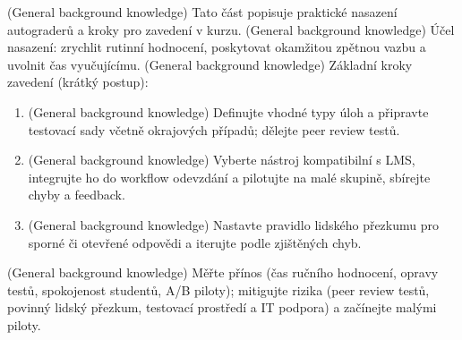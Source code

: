 (General background knowledge) Tato část popisuje praktické nasazení autograderů a kroky pro zavedení v kurzu.
(General background knowledge) Účel nasazení: zrychlit rutinní hodnocení, poskytovat okamžitou zpětnou vazbu a uvolnit čas vyučujícímu.
(General background knowledge) Základní kroky zavedení (krátký postup):
\begin{enumerate}
\item (General background knowledge) Definujte vhodné typy úloh a připravte testovací sady včetně okrajových případů; dělejte peer review testů.
\item (General background knowledge) Vyberte nástroj kompatibilní s LMS, integrujte ho do workflow odevzdání a pilotujte na malé skupině, sbírejte chyby a feedback.
\item (General background knowledge) Nastavte pravidlo lidského přezkumu pro sporné či otevřené odpovědi a iterujte podle zjištěných chyb.
\end{enumerate}
(General background knowledge) Měřte přínos (čas ručního hodnocení, opravy testů, spokojenost studentů, A/B piloty); mitigujte rizika (peer review testů, povinný lidský přezkum, testovací prostředí a IT podpora) a začínejte malými piloty.